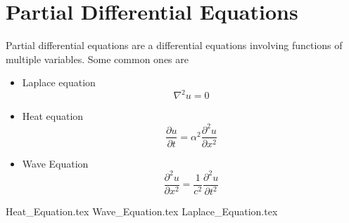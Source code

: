 \section{Partial Differential Equations}
Partial differential equations are a differential equations involving functions of multiple variables. Some common ones are
\begin{itemize}
    \item Laplace equation
    $$\nabla^2 u=0$$
    \item Heat equation
    $$\frac{\partial u}{\partial t}=\alpha^2\frac{\partial^2u}{\partial x^2}$$
    \item Wave Equation
    $$\frac{\partial^2u}{\partial x^2}=\frac{1}{c^2}\frac{\partial^2 u}{\partial t^2}$$
\end{itemize}

{Heat_Equation.tex}
{Wave_Equation.tex}
{Laplace_Equation.tex}